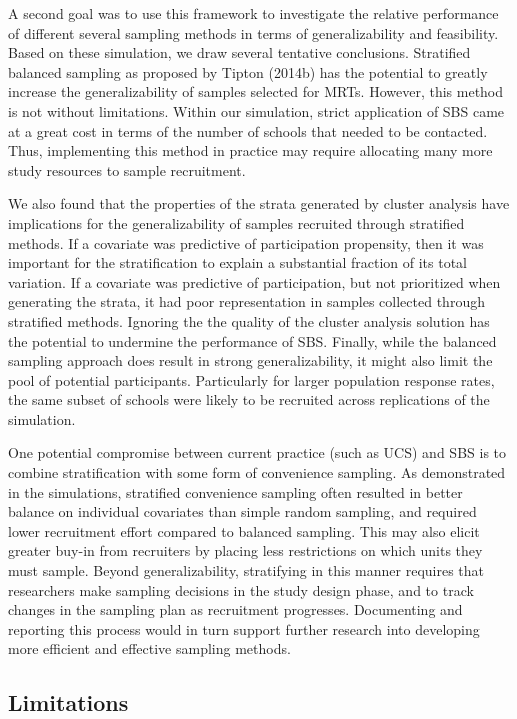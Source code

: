 \documentclass[
  english,
  man,floatsintext]{apa6}
\begin{document}
A second goal was to use this framework to investigate the relative performance of different several sampling methods in terms of generalizability and feasibility. Based on these simulation, we draw several tentative conclusions. Stratified balanced sampling as proposed by Tipton (2014b) has the potential to greatly increase the generalizability of samples selected for MRTs. However, this method is not without limitations. Within our simulation, strict application of SBS came at a great cost in terms of the number of schools that needed to be contacted. Thus, implementing this method in practice may require allocating many more study resources to sample recruitment.

We also found that the properties of the strata generated by cluster analysis have implications for the generalizability of samples recruited through stratified methods. If a covariate was predictive of participation propensity, then it was important for the stratification to explain a substantial fraction of its total variation. If a covariate was predictive of participation, but not prioritized when generating the strata, it had poor representation in samples collected through stratified methods. Ignoring the the quality of the cluster analysis solution has the potential to undermine the performance of SBS. Finally, while the balanced sampling approach does result in strong generalizability, it might also limit the pool of potential participants. Particularly for larger population response rates, the same subset of schools were likely to be recruited across replications of the simulation.

One potential compromise between current practice (such as UCS) and SBS is to combine stratification with some form of convenience sampling. As demonstrated in the simulations, stratified convenience sampling often resulted in better balance on individual covariates than simple random sampling, and required lower recruitment effort compared to balanced sampling. This may also elicit greater buy-in from recruiters by placing less restrictions on which units they must sample.
Beyond generalizability, stratifying in this manner requires that researchers make sampling decisions in the study design phase, and to track changes in the sampling plan as recruitment progresses. Documenting and reporting this process would in turn support further research into developing more efficient and effective sampling methods.

\hypertarget{limitations}{%
\subsection{Limitations}\label{limitations}}
\end{document}
